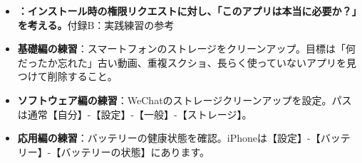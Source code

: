 
\begin{itemize}
  \item \textbf{：インストール時の権限リクエストに対し、「このアプリは本当に必要か？」を考える。}付録B：実践練習の参考
  \item \textbf{基礎編の練習}：スマートフォンのストレージをクリーンアップ。目標は「何だったか忘れた」古い動画、重複スクショ、長らく使っていないアプリを見つけて削除すること。
  \item \textbf{ソフトウェア編の練習}：WeChatのストレージクリーンアップを設定。パスは通常【自分】-【設定】-【一般】-【ストレージ】。
  \item \textbf{応用編の練習}：バッテリーの健康状態を確認。iPhoneは【設定】-【バッテリー】-【バッテリーの状態】にあります。
\end{itemize}
